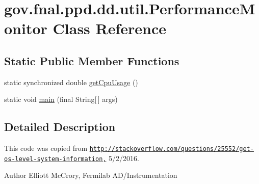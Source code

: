 \hypertarget{classgov_1_1fnal_1_1ppd_1_1dd_1_1util_1_1PerformanceMonitor}{\section{gov.\-fnal.\-ppd.\-dd.\-util.\-Performance\-Monitor Class Reference}
\label{classgov_1_1fnal_1_1ppd_1_1dd_1_1util_1_1PerformanceMonitor}
}
\subsection*{Static Public Member Functions}
\begin{DoxyCompactItemize}
\item 
static synchronized double \hyperlink{classgov_1_1fnal_1_1ppd_1_1dd_1_1util_1_1PerformanceMonitor_a1d535cff921ba7d0e2778342d796c905}{get\-Cpu\-Usage} ()
\item 
static void \hyperlink{classgov_1_1fnal_1_1ppd_1_1dd_1_1util_1_1PerformanceMonitor_ad4cd84473c2b346ee8714b2f5d1055ce}{main} (final String\mbox{[}$\,$\mbox{]} args)
\end{DoxyCompactItemize}


\subsection{Detailed Description}
This code was copied from \href{http://stackoverflow.com/questions/25552/get-os-level-system-information,}{\tt http\-://stackoverflow.\-com/questions/25552/get-\/os-\/level-\/system-\/information,} 5/2/2016.

\begin{DoxyAuthor}{Author}
Elliott Mc\-Crory, Fermilab A\-D/\-Instrumentation 
\end{DoxyAuthor}


